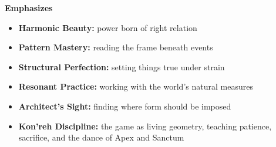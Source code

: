 \noindent\textbf{Emphasizes}
\begin{itemize}
  \item \textbf{Harmonic Beauty:} power born of right relation
  \item \textbf{Pattern Mastery:} reading the frame beneath events
  \item \textbf{Structural Perfection:} setting things true under strain
  \item \textbf{Resonant Practice:} working with the world's natural measures
  \item \textbf{Architect's Sight:} finding where form should be imposed
  \item \textbf{Kon'reh Discipline:} the game as living geometry, teaching patience, sacrifice, and the dance of Apex and Sanctum
\end{itemize}

